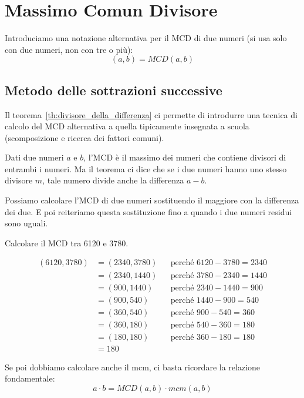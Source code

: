 \chapter{Massimo Comun Divisore}

Introduciamo una notazione alternativa per il MCD di due numeri (si usa solo con due numeri, non con tre o più):
\begin{equation*}
    (a, b) = MCD(a, b)
\end{equation*}

\section{Metodo delle sottrazioni successive}

Il teorema~\ref{th:divisore_della_differenza} ci permette di introdurre una tecnica di calcolo del MCD alternativa a quella tipicamente insegnata a scuola (scomposizione e ricerca dei fattori comuni).

Dati due numeri $a$ e $b$, l'MCD è il massimo dei numeri che contiene divisori di entrambi i numeri. Ma il teorema ci dice che se i due numeri hanno uno stesso divisore $m$, tale numero divide anche la differenza $a - b$.

\begin{definizione}

Possiamo calcolare l'MCD di due numeri sostituendo il maggiore con la differenza dei due. E poi reiteriamo questa sostituzione fino a quando i due numeri residui sono uguali.

\end{definizione}

    \begin{esercizio}
        Calcolare il MCD tra 6120 e 3780.
    \end{esercizio}
    \begin{soluzione}
        \begin{align*}
            (6120, 3780) &= (2340, 3780) &&\text{perché } 6120 - 3780 = 2340 \\
            &= (2340, 1440) &&\text{perché } 3780 - 2340 = 1440 \\
            &= (900, 1440) &&\text{perché } 2340 - 1440 = 900 \\
            &= (900, 540) &&\text{perché } 1440 - 900 = 540 \\
            &= (360, 540) &&\text{perché } 900 - 540 = 360 \\
            &= (360, 180) &&\text{perché } 540 - 360 = 180 \\
            &= (180, 180) &&\text{perché } 360 - 180 = 180 \\
            &= 180
        \end{align*}
    \end{soluzione}

Se poi dobbiamo calcolare anche il mcm, ci basta ricordare la relazione fondamentale:
\begin{equation}
    a \cdot b = MCD(a, b) \cdot mcm(a, b)
\end{equation}


